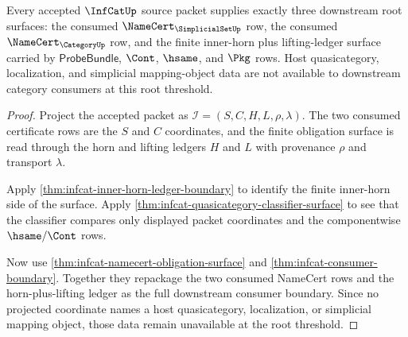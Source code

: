 \begin{theorem}
\label{thm:infcat-root-threshold-obligation-triad}
Every accepted $\InfCatUp$ source packet supplies exactly three downstream root
surfaces: the consumed $\NameCert_{\SimplicialSetUp}$ row, the consumed
$\NameCert_{\CategoryUp}$ row, and the finite inner-horn plus lifting-ledger
surface carried by $\mathsf{ProbeBundle}$, $\Cont$, $\hsame$, and $\Pkg$ rows.
Host quasicategory, localization, and simplicial mapping-object data are not
available to downstream category consumers at this root threshold.
\end{theorem}
\begin{proof}
Project the accepted packet as
$\mathcal{I}=(S,C,H,L,\rho,\lambda)$. The two consumed certificate rows are
the $S$ and $C$ coordinates, and the finite obligation surface is read through
the horn and lifting ledgers $H$ and $L$ with provenance $\rho$ and transport
$\lambda$.

Apply \autoref{thm:infcat-inner-horn-ledger-boundary} to identify the finite
inner-horn side of the surface. Apply
\autoref{thm:infcat-quasicategory-classifier-surface} to see that the
classifier compares only displayed packet coordinates and the componentwise
$\hsame/\Cont$ rows.

Now use \autoref{thm:infcat-namecert-obligation-surface} and
\autoref{thm:infcat-consumer-boundary}. Together they repackage the two
consumed NameCert rows and the horn-plus-lifting ledger as the full downstream
consumer boundary. Since no projected coordinate names a host quasicategory,
localization, or simplicial mapping object, those data remain unavailable at
the root threshold.
\end{proof}

